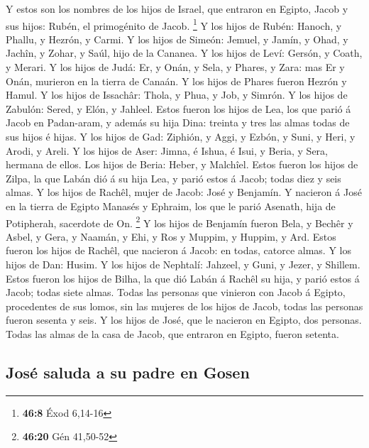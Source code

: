  Y estos son los nombres de los hijos de Israel, que
entraron en Egipto, Jacob y sus hijos: Rubén, el primogénito de Jacob.
\footnote{\textbf{46:8} Éxod 6,14-16}  Y los hijos de
Rubén: Hanoch, y Phallu, y Hezrón, y Carmi.  Y los hijos
de Simeón: Jemuel, y Jamín, y Ohad, y Jachîn, y Zohar, y Saúl, hijo de
la Cananea.  Y los hijos de Leví: Gersón, y Coath, y
Merari.  Y los hijos de Judá: Er, y Onán, y Sela, y
Phares, y Zara: mas Er y Onán, murieron en la tierra de Canaán. Y los
hijos de Phares fueron Hezrón y Hamul.  Y los hijos de
Issachâr: Thola, y Phua, y Job, y Simrón.  Y los hijos de
Zabulón: Sered, y Elón, y Jahleel.  Estos fueron los
hijos de Lea, los que parió á Jacob en Padan-aram, y además su hija
Dina: treinta y tres las almas todas de sus hijos é hijas.
 Y los hijos de Gad: Ziphión, y Aggi, y Ezbón, y Suni, y
Heri, y Arodi, y Areli.  Y los hijos de Aser: Jimna, é
Ishua, é Isui, y Beria, y Sera, hermana de ellos. Los hijos de Beria:
Heber, y Malchîel.  Estos fueron los hijos de Zilpa, la
que Labán dió á su hija Lea, y parió estos á Jacob; todas diez y seis
almas.  Y los hijos de Rachêl, mujer de Jacob: José y
Benjamín.  Y nacieron á José en la tierra de Egipto
Manasés y Ephraim, los que le parió Asenath, hija de Potipherah,
sacerdote de On. \footnote{\textbf{46:20} Gén 41,50-52} 
Y los hijos de Benjamín fueron Bela, y Bechêr y Asbel, y Gera, y Naamán,
y Ehi, y Ros y Muppim, y Huppim, y Ard.  Estos fueron los
hijos de Rachêl, que nacieron á Jacob: en todas, catorce almas.
 Y los hijos de Dan: Husim.  Y los hijos
de Nephtalí: Jahzeel, y Guni, y Jezer, y Shillem.  Estos
fueron los hijos de Bilha, la que dió Labán á Rachêl su hija, y parió
estos á Jacob; todas siete almas.  Todas las personas que
vinieron con Jacob á Egipto, procedentes de sus lomos, sin las mujeres
de los hijos de Jacob, todas las personas fueron sesenta y seis.
 Y los hijos de José, que le nacieron en Egipto, dos
personas. Todas las almas de la casa de Jacob, que entraron en Egipto,
fueron setenta.

\hypertarget{josuxe9-saluda-a-su-padre-en-gosen}{%
\subsection{José saluda a su padre en
Gosen}\label{josuxe9-saluda-a-su-padre-en-gosen}}

